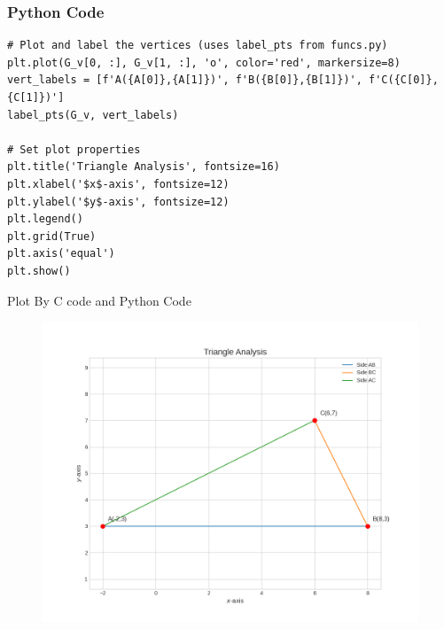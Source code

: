 \documentclass{beamer}
\begin{document}
\begin{frame}[fragile]
\frametitle{Python Code}
\begin{lstlisting}
# Plot and label the vertices (uses label_pts from funcs.py)
plt.plot(G_v[0, :], G_v[1, :], 'o', color='red', markersize=8)
vert_labels = [f'A({A[0]},{A[1]})', f'B({B[0]},{B[1]})', f'C({C[0]},{C[1]})']
label_pts(G_v, vert_labels)

# Set plot properties
plt.title('Triangle Analysis', fontsize=16)
plt.xlabel('$x$-axis', fontsize=12)
plt.ylabel('$y$-axis', fontsize=12)
plt.legend()
plt.grid(True)
plt.axis('equal')
plt.show()
\end{lstlisting}
\end{frame}   
\begin{frame}{Plot By C code and Python Code}
    \begin{figure}
    \centering
    \includegraphics[width=0.7\columnwidth]{figs/Figure_1.png}
    \label{fig:placeholder}
\end{figure}
\end{frame}
\end{document}
